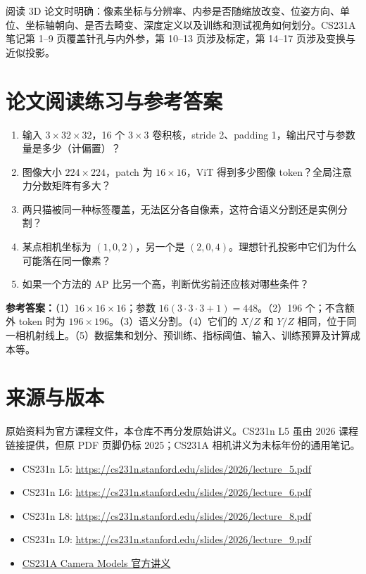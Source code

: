 \documentclass[11pt,a4paper,fontset=none]{ctexart}
\begin{document}
阅读 3D 论文时明确：像素坐标与分辨率、内参是否随缩放改变、位姿方向、单位、坐标轴朝向、是否去畸变、深度定义以及训练和测试视角如何划分。CS231A 笔记第 1--9 页覆盖针孔与内外参，第 10--13 页涉及标定，第 14--17 页涉及变换与近似投影。
\section{论文阅读练习与参考答案}
\begin{enumerate}
\item 输入 $3\times32\times32$，16 个 $3\times3$ 卷积核，stride 2、padding 1，输出尺寸与参数量是多少（计偏置）？
\item 图像大小 $224\times224$，patch 为 $16\times16$，ViT 得到多少图像 token？全局注意力分数矩阵有多大？
\item 两只猫被同一种标签覆盖，无法区分各自像素，这符合语义分割还是实例分割？
\item 某点相机坐标为 $(1,0,2)$，另一个是 $(2,0,4)$。理想针孔投影中它们为什么可能落在同一像素？
\item 如果一个方法的 AP 比另一个高，判断优劣前还应核对哪些条件？
\end{enumerate}
\textbf{参考答案：}（1）$16\times16\times16$；参数 $16(3\cdot3\cdot3+1)=448$。（2）196 个；不含额外 token 时为 $196\times196$。（3）语义分割。（4）它们的 $X/Z$ 和 $Y/Z$ 相同，位于同一相机射线上。（5）数据集和划分、预训练、指标阈值、输入、训练预算及计算成本等。
\section{来源与版本}
原始资料为官方课程文件，本仓库不再分发原始讲义。CS231n L5 虽由 2026 课程链接提供，但原 PDF 页脚仍标 2025；CS231A 相机讲义为未标年份的通用笔记。
\begin{itemize}
\item CS231n L5: \url{https://cs231n.stanford.edu/slides/2026/lecture_5.pdf}
\item CS231n L6: \url{https://cs231n.stanford.edu/slides/2026/lecture_6.pdf}
\item CS231n L8: \url{https://cs231n.stanford.edu/slides/2026/lecture_8.pdf}
\item CS231n L9: \url{https://cs231n.stanford.edu/slides/2026/lecture_9.pdf}
\item \href{https://web.stanford.edu/class/cs231a/course_notes/01-camera-models.pdf}{CS231A Camera Models 官方讲义}
\end{itemize}
\end{document}
